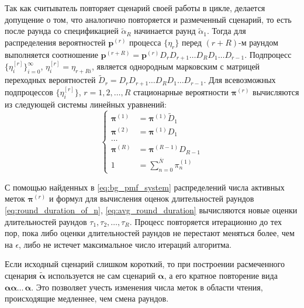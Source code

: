 Так как считыватель повторяет сценарий своей работы в цикле, делается допущение о том, что аналогично повторяется и размеченный сценарий, то есть после раунда со спецификацией $\widetilde{\alpha}_{R}$ начинается раунд $\widetilde{\alpha}_1$. Тогда для распределения вероятностей $\bm{p}^{(r)}$ процесса $\{ \eta_r \}$ перед $(r + R)$-м раундом выполняется соотношение $\bm{p}^{(r+R)} = \bm{p}^{(r)} D_r D_{r+1} \dots D_R D_1 \dots D_{r-1}$. Подпроцесс $\{ \eta_i^{[r]} \}_{i=0}^\infty$, $\eta_i^{[r]} = \eta_{r+Ri}$, является однородным марковским с матрицей переходных вероятностей $\widetilde{D}_r = D_r D_{r+1} \dots D_R D_1 \dots D_{r-1}$. Для всевозможных подпроцессов $\{ \eta_i^{[r]} \}$, $r = 1, 2, \dots, R$ стационарные вероятности $\bm{\pi}^{(r)}$ вычисляются из следующей системы линейных уравнений:
\begin{equation}\label{eq:bg_pmf_system}
	\begin{cases}
		\bm{\pi}^{(1)} &= \bm{\pi}^{(1)} \widetilde{D}_1\\
		\bm{\pi}^{(2)} &= \bm{\pi}^{(1)} D_1\\
		\dots&\\
		\bm{\pi}^{(R)} &= \bm{\pi}^{(R-1)} D_{R-1}\\
		1              &= \sum\limits_{n=0}^{\overline{N}} \pi^{(1)}_n
	\end{cases}
\end{equation}

С помощью найденных в \eqref{eq:bg_pmf_system} распределений числа активных меток $\bm{\pi}^{(r)}$ и формул для вычисления оценок длительностей раундов \eqref{eq:round_duration_of_n}, \eqref{eq:avg_round_duration} вычисляются новые оценки длительностей раундов $\tau_1, \tau_2, \dots, \tau_R$. Процесс повторяется итерационно до тех пор, пока либо оценки длительностей раундов не перестают меняться более, чем на $\epsilon$, либо не истечет максимальное число итераций алгоритма.

Если исходный сценарий слишком короткий, то при построении расмеченного сценария $\widetilde{\bm{\alpha}}$ используется не сам сценарий $\bm{\alpha}$, а его кратное повторение вида $\bm{\alpha} \bm{\alpha} \dots\, \bm{\alpha}$. Это позволяет учесть изменения числа меток в области чтения, происходящие медленнее, чем смена раундов.

